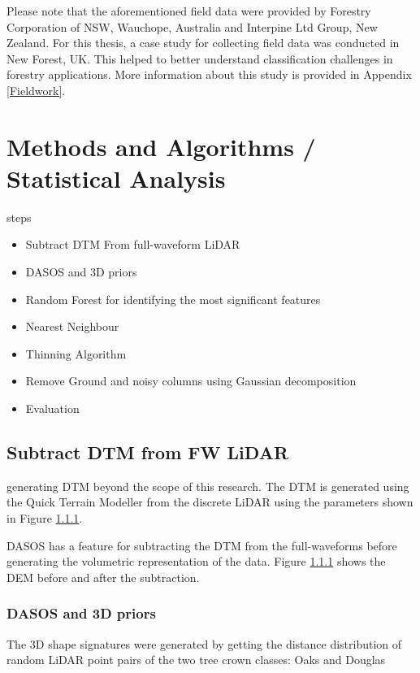 \documentclass{subfiles}
\begin{document}
\par Please note that the aforementioned field data were provided by Forestry Corporation of NSW, Wauchope, Australia and Interpine Ltd Group, New Zealand. For this thesis, a case study for collecting field data was conducted in New Forest, UK. This helped to better understand classification challenges in forestry applications. More information about this study is provided in Appendix \ref{Fieldwork}.


\section{Methods and Algorithms / Statistical Analysis}

\par steps

\begin{itemize}
	\item Subtract DTM From full-waveform LiDAR
	\item DASOS and 3D priors
	\item Random Forest for identifying the most significant features
	\item Nearest Neighbour 
	\item Thinning Algorithm
	\item Remove Ground and noisy columns using Gaussian decomposition
	\item Evaluation
\end{itemize}

\subsection{Subtract DTM from FW LiDAR}\label{sec:DTMsub}

\par generating DTM beyond the scope of this research. The DTM is generated using the Quick Terrain Modeller from the discrete LiDAR using the parameters shown in Figure \ref{}. 

DASOS has a feature for subtracting the DTM from the full-waveforms before generating the volumetric representation of the data. Figure \ref{} shows the DEM before and after the subtraction. 

\subsubsection{DASOS and 3D priors}

\par The 3D shape signatures were generated by getting the distance distribution of random LiDAR point pairs of the two tree crown classes: Oaks and Douglas \cite{Dong2009}
\end{document}
